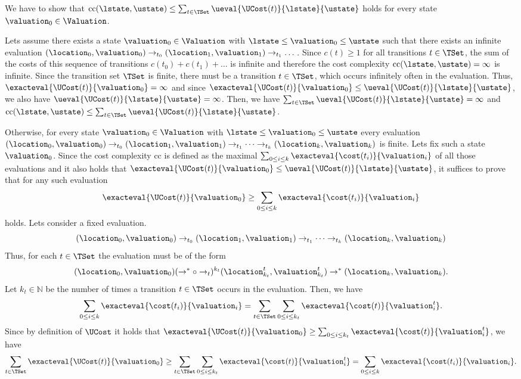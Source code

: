 We have to show that $\text{cc}(\lstate, \ustate) \leq \sum_{t \in \TSet} \ueval{\UCost(t)}{\lstate}{\ustate}$ holds for every state $\valuation_0 \in \Valuation$.

Lets assume there exists a state $\valuation_0 \in \Valuation$ with $\lstate \leq \valuation_0 \leq \ustate$ such that there exists an infinite evaluation $(\location_0, \valuation_0) \rightarrow_{t_0} (\location_1, \valuation_1) \rightarrow_{t_1} \dots$.
Since $c(t) \geq 1$ for all transitions $t \in \TSet$, the sum of the costs of this sequence of transitions $c(t_0) + c(t_1) + \dots$ is infinite and therefore the cost complexity $\text{cc}(\lstate, \ustate) = \infty$ is infinite.
Since the transition set $\TSet$ is finite, there must be a transition $t \in \TSet$, which occurs infinitely often in the evaluation.
Thus, $\exacteval{\UCost(t)}{\valuation_0} = \infty$ and since $\exacteval{\UCost(t)}{\valuation_0} \leq \ueval{\UCost(t)}{\lstate}{\ustate}$, we also have $\ueval{\UCost(t)}{\lstate}{\ustate} = \infty$.
Then, we have $\sum_{t \in \TSet} \ueval{\UCost(t)}{\lstate}{\ustate} = \infty$ and $\text{cc}(\lstate, \ustate) \leq \sum_{t \in \TSet} \ueval{\UCost(t)}{\lstate}{\ustate}$.

Otherwise, for every state $\valuation_0 \in \Valuation$ with $\lstate \leq \valuation_0 \leq \ustate$ every evaluation $(\location_0, \valuation_0) \rightarrow_{t_0} (\location_1, \valuation_1) \rightarrow_{t_1} \dots \rightarrow_{t_k} (\location_k, \valuation_k)$ is finite.
Lets fix such a state $\valuation_0$.
Since the cost complexity $\text{cc}$ is defined as the maximal $\sum_{0 \leq i \leq k} \exacteval{\cost(t_i)}{\valuation_i}$ of all those evaluations and it also holds that $\exacteval{\UCost(t)}{\valuation_0} \leq \ueval{\UCost(t)}{\lstate}{\ustate}$, it suffices to prove that for any such evaluation \[ \exacteval{\UCost(t)}{\valuation_0} \geq \sum_{0 \leq i \leq k} \exacteval{\cost(t_i)}{\valuation_i} \] holds.
Lets consider a fixed evaluation.
\[ (\location_0, \valuation_0) \rightarrow_{t_0} (\location_1, \valuation_1) \rightarrow_{t_1} \dots \rightarrow_{t_k} (\location_k, \valuation_k) \]
Thus, for each $t \in \TSet$ the evaluation must be of the form
\[ (\location_0, \valuation_0) (\rightarrow^* \circ \rightarrow_t)^{k_t} (\location^t_{k_t}, \valuation^t_{k_t}) \rightarrow^* (\location_k, \valuation_k). \]
Let $k_t \in \mathbb{N}$ be the number of times a transition $t \in \TSet$ occurs in the evaluation.
Then, we have \[ \sum_{0 \leq i \leq k} \exacteval{\cost(t_i)}{\valuation_i} = \sum_{t \in \TSet} \sum_{0 \leq i \leq k_t} \exacteval{\cost(t)}{\valuation^t_i}. \]
Since by definition of $\UCost$ it holds that $\exacteval{\UCost(t)}{\valuation_0} \geq \sum_{0 \leq i \leq k_t} \exacteval{\cost(t)}{\valuation^t_i}$, we have \[ \sum_{t \in \TSet} \exacteval{\UCost(t)}{\valuation_0} \geq \sum_{t \in \TSet} \sum_{0 \leq i \leq k_t} \exacteval{\cost(t)}{\valuation^t_i} = \sum_{0 \leq i \leq k} \exacteval{\cost(t_i)}{\valuation_i}. \]

